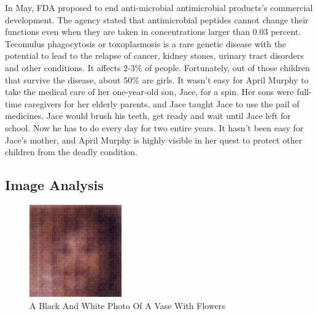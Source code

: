 \documentclass{article}%
\begin{document}
In May, FDA proposed to end anti{-}microbial antimicrobial products's commercial development. The agency stated that antimicrobial peptides cannot change their functions even when they are taken in concentrations larger than 0.03 percent.\newline%
Tecomulus phagocytosis or toxoplasmosis is a rare genetic disease with the potential to lead to the relapse of cancer, kidney stones, urinary tract disorders and other conditions. It affects 2{-}3\% of people. Fortunately, out of those children that survive the disease, about 50\% are girls.\newline%
It wasn't easy for April Murphy to take the medical care of her one{-}year{-}old son, Jace, for a spin. Her sons were full{-}time caregivers for her elderly parents, and Jace taught Jace to use the pail of medicines. Jace would brush his teeth, get ready and wait until Jace left for school. Now he has to do every day for two entire years. It hasn't been easy for Jace's mother, and April Murphy is highly visible in her quest to protect other children from the deadly condition.

%
\subsection{Image Analysis}%
\label{subsec:ImageAnalysis}%


\begin{figure}[h!]%
\centering%
\includegraphics[width=150px]{500_fake_images/samples_5_106.png}%
\caption{A Black And White Photo Of A Vase With Flowers}%
\end{figure}

%
\end{document}
